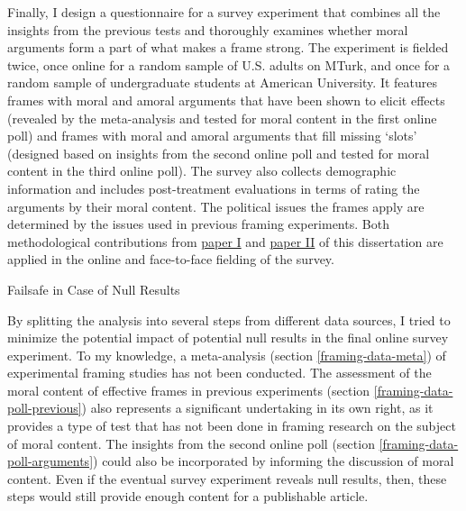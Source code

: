 \documentclass[12pt,]{article}
\makeatletter
\renewcommand\subsubsection{\@startsection{subsubsection}{3}{\z@}
                                     {-3.25ex\@plus -1ex \@minus -.2ex}
                                     {1.5ex \@plus .2ex}
                                     {\normalsize\itshape}} %
\makeatother
\begin{document}
Finally, I design a questionnaire for a survey experiment that combines
all the insights from the previous tests and thoroughly examines whether
moral arguments form a part of what makes a frame strong. The experiment
is fielded twice, once online for a random sample of U.S. adults on
MTurk, and once for a random sample of undergraduate students at
American University. It features frames with moral and amoral arguments
that have been shown to elicit effects (revealed by the meta-analysis
and tested for moral content in the first online poll) and frames with
moral and amoral arguments that fill missing `slots' (designed based on
insights from the second online poll and tested for moral content in the
third online poll). The survey also collects demographic information and
includes post-treatment evaluations in terms of rating the arguments by
their moral content. The political issues the frames apply are
determined by the issues used in previous framing experiments. Both
methodological contributions from
\protect\hyperlink{paper-i-improving-balance-in-survey-experiments-with-ordinal-variables}{paper
I} and
\protect\hyperlink{paper-ii-measuring-mode-effects-for-ordinal-survey-responses-in-online-and-face-to-face-survey-experiments}{paper
II} of this dissertation are applied in the online and face-to-face
fielding of the survey.

\subsubsection{Failsafe in Case of Null
Results}\label{framing-data-failsafe}

By splitting the analysis into several steps from different data
sources, I tried to minimize the potential impact of potential null
results in the final online survey experiment. To my knowledge, a
meta-analysis (section \ref{framing-data-meta}) of experimental framing
studies has not been conducted. The assessment of the moral content of
effective frames in previous experiments (section
\ref{framing-data-poll-previous}) also represents a significant
undertaking in its own right, as it provides a type of test that has not
been done in framing research on the subject of moral content. The
insights from the second online poll (section
\ref{framing-data-poll-arguments}) could also be incorporated by
informing the discussion of moral content. Even if the eventual survey
experiment reveals null results, then, these steps would still provide
enough content for a publishable article.


\newpage



\singlespacing 

\end{document}
